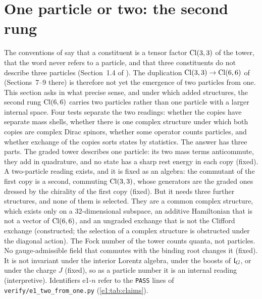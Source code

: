 \section{One particle or two: the second rung}
\label{e1:sec:main}

The conventions of \cite{ES17} say that a constituent is a tensor factor $\mathrm{Cl}(3,3)$ of the tower, that the word never refers to a
particle, and that three constituents do not describe three particles (Section~1.4 of \cite{ES17}). The duplication
$\mathrm{Cl}(3,3)\to\mathrm{Cl}(6,6)$ of \cite{RE} (Sections~7--9 there) is therefore not yet the emergence of two particles from one. This section
asks in what precise sense, and under which added structures, the second rung $\mathrm{Cl}(6,6)$ carries two particles rather than one
particle with a larger internal space. Four tests separate the two readings: whether the copies have separate mass shells, whether
there is one complex structure under which both copies are complex Dirac spinors, whether some operator counts particles, and whether
exchange of the copies sorts states by statistics. The answer has three parts. The graded tower describes one particle: its two mass
terms anticommute, they add in quadrature, and no state has a sharp rest energy in each copy (fixed). A two-particle reading exists, and
it is fixed as an algebra: the commutant of the first copy is a second, commuting $\mathrm{Cl}(3,3)$, whose generators are the graded ones
dressed by the chirality of the first copy (fixed). But it needs three further structures, and none of them is selected. They are
a common complex structure, which exists only on a $32$-dimensional subspace, an additive Hamiltonian that is not a vector of
$\mathrm{Cl}(6,6)$, and an ungraded exchange that is not the Clifford exchange (constructed; the selection of a complex structure is obstructed
under the diagonal action). The Fock number of the tower counts quanta, not particles. No gauge-admissible field that commutes with the
binding root changes it (fixed). It is not invariant under the interior Lorentz algebra, under the boosts of $\mathfrak l_G$, or under the
charge $J$ (fixed), so as a particle number it is an internal reading (interpretive). Identifiers e1-$n$ refer to the \texttt{PASS} lines of
\texttt{verify/e1\_two\_from\_one.py} (\cref{e1:tab:claims}).

